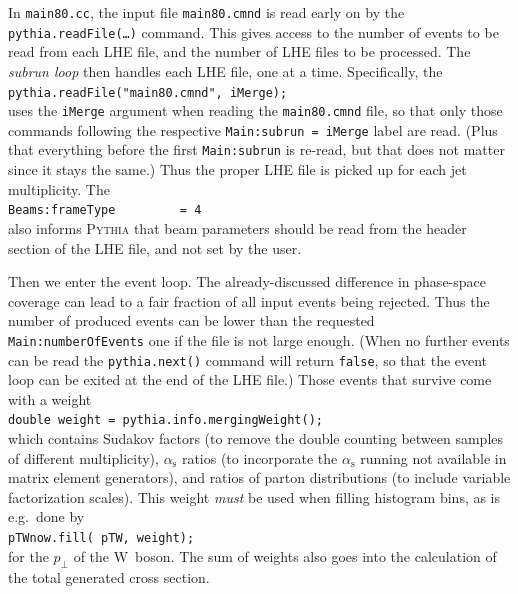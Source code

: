 \documentclass[12pt,a4paper]{article}
\newcommand{\as}{\alpha_{\mathrm{s}}}
\newcommand{\W}{{\mathrm W}}
\begin{document}
In \texttt{main80.cc}, the input file \texttt{main80.cmnd} is read early on
by the \texttt{pythia.readFile(\dots)} command. This gives access to the 
number of events to be read from each LHE file, and the number of LHE files
to be processed. The \textit{subrun loop} then handles each LHE file,
one at a time. Specifically, the\\
\hspace*{10mm}\texttt{pythia.readFile("main80.cmnd", iMerge);}\\  
uses the \texttt{iMerge} argument when reading the \texttt{main80.cmnd} 
file, so that only those commands following the respective 
\texttt{Main:subrun = iMerge} label are read. (Plus that everything 
before the first \texttt{Main:subrun} is re-read, but that does not 
matter since it stays the same.) Thus the proper LHE file is picked up for
each jet multiplicity. The\\
\hspace*{10mm}\texttt{Beams:frameType~~~~~~~~~= 4}\\
also informs \textsc{Pythia} that beam parameters should be read from the
header section of the LHE file, and not set by the user.    

Then we enter the event loop. The already-discussed difference in 
phase-space coverage can lead to a fair fraction of all input events 
being rejected. Thus the number of produced events can be lower than 
the requested \texttt{Main:numberOfEvents} one if the file is not
large enough. (When no further events can be read the
\texttt{pythia.next()} command will return \texttt{false}, so that
the event loop can be exited at the end of the LHE file.)
Those events that survive come with a weight\\
\hspace*{10mm}\texttt{double weight = pythia.info.mergingWeight();}\\
which contains Sudakov factors (to remove the double counting between 
samples of different multiplicity), $\as$ ratios (to incorporate the
$\as$ running not available in matrix element generators), and 
ratios of parton distributions (to include variable factorization scales). 
This weight \textit{must} be used when filling histogram bins, as is e.g.\ 
done by\\
\hspace*{10mm}\texttt{pTWnow.fill( pTW, weight);}\\
for the $p_{\perp}$ of the $\W$\ boson. The sum of weights also goes into
the calculation of the total generated cross section. 
\end{document}
